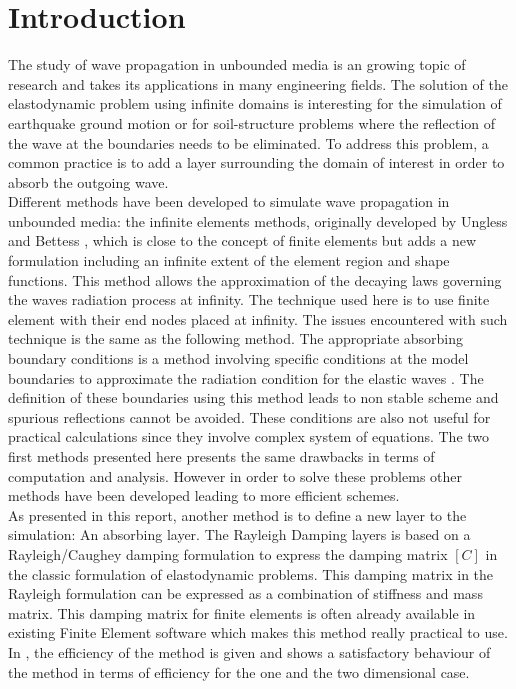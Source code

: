 
\pagestyle{plain}
\setcounter{page}{1}
\section*{Introduction}


The study of wave propagation in unbounded media is an growing topic of research and takes its applications in many engineering fields. 
The solution of the elastodynamic problem using infinite domains is interesting for the simulation of earthquake ground motion or for soil-structure problems where the reflection of the wave at the boundaries needs to be eliminated. 
To address this problem, a common practice is to add a layer surrounding the domain of interest in order to absorb the outgoing wave.   \\
Different methods have been developed to simulate wave propagation in unbounded media: the infinite elements methods, originally developed by Ungless \cite{Ungless} and Bettess \cite{Bettess}, which is close to the concept of finite elements but adds a new formulation including an infinite extent of the element region and shape functions. This method allows the approximation of the decaying laws governing the waves radiation process at infinity. The technique used here is to use finite element with their end nodes placed at infinity. The issues encountered with such technique is the same as the following method.  The appropriate absorbing boundary conditions is a method involving specific conditions at the model boundaries to approximate the radiation condition for the elastic waves \cite{Engquist}. The definition of these boundaries using this method leads to non stable scheme and spurious reflections cannot be avoided. These conditions are also not useful for practical calculations since they involve complex system of equations. The two first methods presented here presents the same drawbacks in terms of computation and analysis. However in order to solve these problems other methods have been developed leading to more efficient schemes.\\ 
As presented in this report, another method is to define a new layer to the simulation: An absorbing layer. The Rayleigh Damping layers is based on a Rayleigh/Caughey damping formulation to express the damping matrix $[C]$ in the classic formulation of elastodynamic problems. This damping matrix in the Rayleigh formulation can be expressed as a combination of stiffness and mass matrix. This damping matrix for finite elements is often already available in existing Finite Element software which makes this method really practical to use. In \cite{Semblat}, the efficiency of the method is given and shows a satisfactory behaviour of the method in terms of efficiency for the one and the two dimensional case. \\
